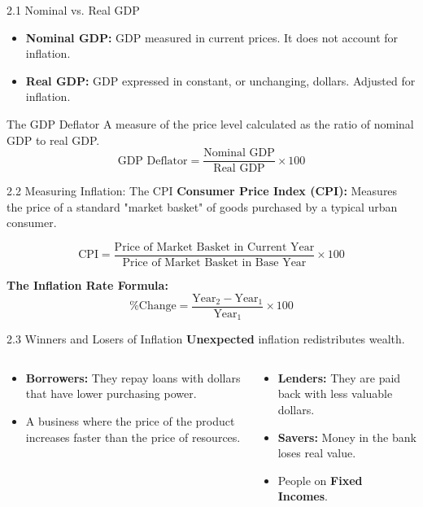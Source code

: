 \documentclass[aspectratio=169, 10pt]{beamer}
\begin{document}
\begin{frame}{2.1 Nominal vs. Real GDP}
    \begin{itemize}
        \item \textbf{Nominal GDP:} GDP measured in current prices. It does not account for inflation.
        \item \textbf{Real GDP:} GDP expressed in constant, or unchanging, dollars. Adjusted for inflation.
    \end{itemize}
    
    \begin{block}{The GDP Deflator}
    A measure of the price level calculated as the ratio of nominal GDP to real GDP.
    $$ \text{GDP Deflator} = \frac{\text{Nominal GDP}}{\text{Real GDP}} \times 100 $$
    \end{block}
\end{frame}

\begin{frame}{2.2 Measuring Inflation: The CPI}
    \textbf{Consumer Price Index (CPI):} Measures the price of a standard "market basket" of goods purchased by a typical urban consumer.
    
    $$ \text{CPI} = \frac{\text{Price of Market Basket in Current Year}}{\text{Price of Market Basket in Base Year}} \times 100 $$
    
    \vspace{0.3cm}
    \textbf{The Inflation Rate Formula:}
    $$ \text{\% Change} = \frac{\text{Year}_2 - \text{Year}_1}{\text{Year}_1} \times 100 $$
\end{frame}

\begin{frame}{2.3 Winners and Losers of Inflation}
    \textbf{Unexpected} inflation redistributes wealth.
    
    \begin{columns}
        \begin{tcolorbox}[colback=green!10, title=Who is HELPED?]
        \begin{itemize}
            \item \textbf{Borrowers:} They repay loans with dollars that have lower purchasing power.
            \item A business where the price of the product increases faster than the price of resources.
        \end{itemize}
        \end{tcolorbox}
        
        \begin{tcolorbox}[colback=red!10, title=Who is HURT?]
        \begin{itemize}
            \item \textbf{Lenders:} They are paid back with less valuable dollars.
            \item \textbf{Savers:} Money in the bank loses real value.
            \item People on \textbf{Fixed Incomes}.
        \end{itemize}
        \end{tcolorbox}
    \end{columns}
\end{frame}
\end{document}
